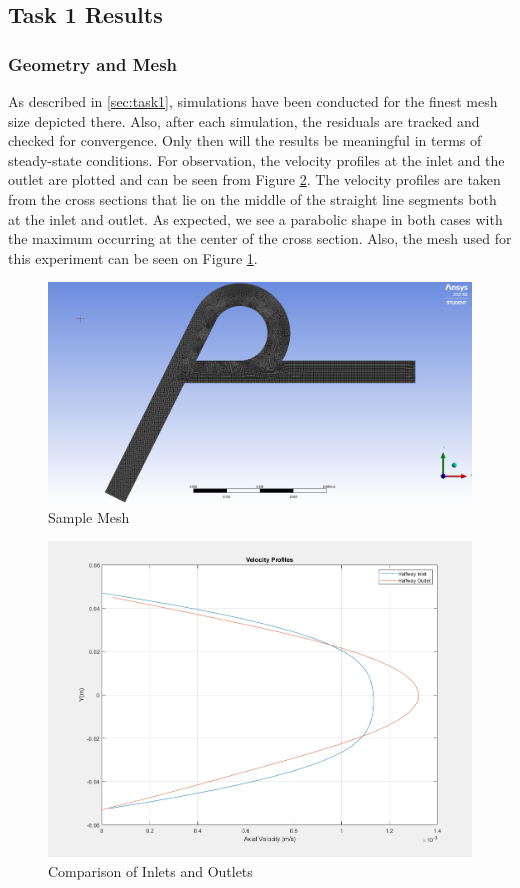 \subsection{Task 1 Results}
\label{sec:task1results}
\subsubsection{Geometry and Mesh}
As described in \ref{sec:task1}, simulations have been conducted for the finest mesh size depicted there. Also, after each simulation, the residuals are tracked and checked for convergence. Only then will the results be meaningful in terms of steady-state conditions. For observation, the velocity profiles at the inlet and the outlet are plotted and can be seen from Figure \ref{fig:in_out_comparison}. The velocity profiles are taken from the cross sections that lie on the middle of the straight line segments both at the inlet and outlet. As expected, we see a parabolic shape in both cases with the maximum occurring at the center of the cross section. Also, the mesh used for this experiment can be seen on Figure \ref{fig:mesh}. 

\begin{figure}[H]
    \centering
    \includegraphics[width=.7\textwidth]{images/task1/3_mesh.png}
    \caption{Sample Mesh}
    \label{fig:mesh}
\end{figure}


\begin{figure}[H]
    \centering
    \includegraphics[width=.7\textwidth]{images/task1/3inlet_vs_outlet.png}
    \caption{Comparison of Inlets and Outlets}
    \label{fig:in_out_comparison}
\end{figure}

